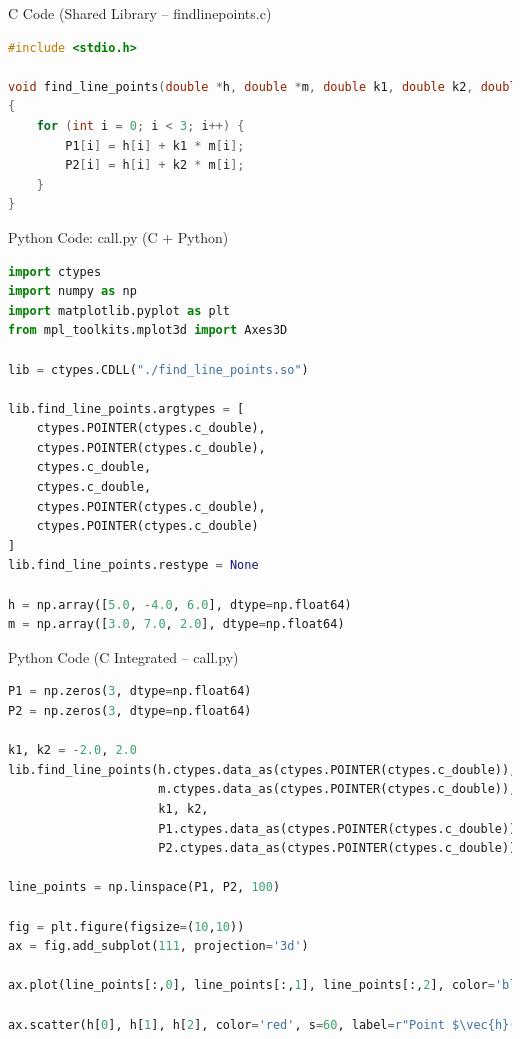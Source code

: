 \documentclass{beamer}
\begin{document}
\begin{frame}[fragile]{C Code (Shared Library – findlinepoints.c)}
\begin{lstlisting}[language=C]
#include <stdio.h>

void find_line_points(double *h, double *m, double k1, double k2, double *P1, double *P2)
{
    for (int i = 0; i < 3; i++) {
        P1[i] = h[i] + k1 * m[i];
        P2[i] = h[i] + k2 * m[i];
    }
}

\end{lstlisting}
\end{frame}

\begin{frame}[fragile]{Python Code: call.py (C + Python)}
\begin{lstlisting}[language=Python]
import ctypes
import numpy as np
import matplotlib.pyplot as plt
from mpl_toolkits.mplot3d import Axes3D

lib = ctypes.CDLL("./find_line_points.so")

lib.find_line_points.argtypes = [
    ctypes.POINTER(ctypes.c_double),  
    ctypes.POINTER(ctypes.c_double),  
    ctypes.c_double,                  
    ctypes.c_double,                  
    ctypes.POINTER(ctypes.c_double),  
    ctypes.POINTER(ctypes.c_double)   
]
lib.find_line_points.restype = None

h = np.array([5.0, -4.0, 6.0], dtype=np.float64)
m = np.array([3.0, 7.0, 2.0], dtype=np.float64)
\end{lstlisting}
\end{frame}

\begin{frame}[fragile]{Python Code (C Integrated – call.py)
}
\begin{lstlisting}[language=Python]
P1 = np.zeros(3, dtype=np.float64)
P2 = np.zeros(3, dtype=np.float64)

k1, k2 = -2.0, 2.0
lib.find_line_points(h.ctypes.data_as(ctypes.POINTER(ctypes.c_double)),
                     m.ctypes.data_as(ctypes.POINTER(ctypes.c_double)),
                     k1, k2,
                     P1.ctypes.data_as(ctypes.POINTER(ctypes.c_double)),
                     P2.ctypes.data_as(ctypes.POINTER(ctypes.c_double)))

line_points = np.linspace(P1, P2, 100)

fig = plt.figure(figsize=(10,10))
ax = fig.add_subplot(111, projection='3d')

ax.plot(line_points[:,0], line_points[:,1], line_points[:,2], color='blue', label=r"$\vec{x} = \vec{h} + \kappa \vec{m}$")

ax.scatter(h[0], h[1], h[2], color='red', s=60, label=r"Point $\vec{h}(5, -4, 6)$")
\end{lstlisting}
\end{frame}
\end{document}
